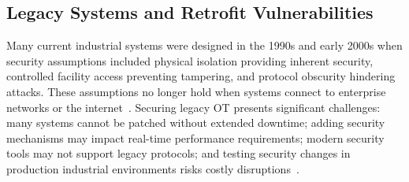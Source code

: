 \documentclass[sigconf,nonacm]{acmart}
\begin{document}
\subsection{Legacy Systems and Retrofit Vulnerabilities}

Many current industrial systems were designed in the 1990s and early 2000s when security
assumptions included physical isolation providing inherent security, controlled facility
access preventing tampering, and protocol obscurity hindering attacks. These assumptions
no longer hold when systems connect to enterprise networks or the
internet~\cite{lee2025dragos}. Securing legacy OT presents significant challenges: many
systems cannot be patched without extended downtime; adding security mechanisms may
impact real-time performance requirements; modern security tools may not support legacy
protocols; and testing security changes in production industrial environments risks
costly disruptions~\cite{fortinet2025ot}.
\end{document}
